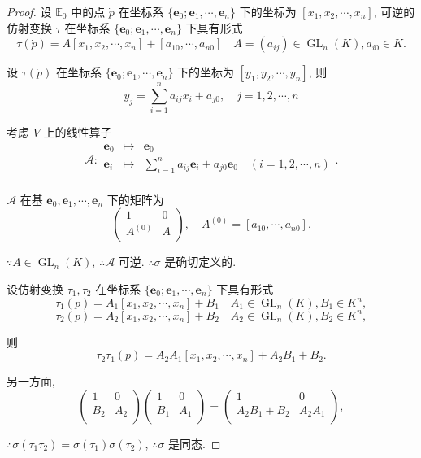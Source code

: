 \documentclass{ctexart}
\begin{document}
\begin{proof}
    设 $\mathbb{E}_0$ 中的点 $\dot{p}$ 在坐标系 $\{\boldsymbol{e}_0;\boldsymbol{e}_1,\cdots,\boldsymbol{e}_n\}$ 下的坐标为 $[x_1,x_2,\cdots,x_n]$, 可逆的仿射变换 $\tau$ 在坐标系 $\{\boldsymbol{e}_0;\boldsymbol{e}_1,\cdots,\boldsymbol{e}_n\}$ 下具有形式
    \[\tau(\dot{p})=A[x_1,x_2,\cdots,x_n]+[a_{10},\cdots,a_{n0}]\quad A=(a_{ij})\in\operatorname{GL}_n(K),a_{i0}\in K.\]

    设 $\tau(\dot{p})$ 在坐标系 $\{\boldsymbol{e}_0;\boldsymbol{e}_1,\cdots,\boldsymbol{e}_n\}$ 下的坐标为 $[y_1,y_2,\cdots,y_n]$, 则
    \[y_j=\sum\limits_{i=1}^na_{ij}x_i+a_{j0},\quad j=1,2,\cdots,n\]

    考虑 $V$ 上的线性算子
    \[\mathcal{A}:\begin{array}{rcl}
        \boldsymbol{e}_0 & \mapsto & \boldsymbol{e}_0 \\
        \boldsymbol{e}_i & \mapsto & \sum\limits_{i=1}^na_{ij}\boldsymbol{e}_i+a_{j0}\boldsymbol{e}_0\quad(i=1,2,\cdots,n) \\
    \end{array}.\]

    $\mathcal{A}$ 在基 $\boldsymbol{e}_0,\boldsymbol{e}_1,\cdots,\boldsymbol{e}_n$ 下的矩阵为
    \[\begin{pmatrix}
        1 & 0 \\
        A^{(0)} & A \\
    \end{pmatrix},\quad A^{(0)}=[a_{10},\cdots,a_{n0}].\]

    $\because A\in\operatorname{GL}_n(K)$, $\therefore\mathcal{A}$ 可逆. $\therefore\sigma$ 是确切定义的.

    设仿射变换 $\tau_1,\tau_2$ 在坐标系 $\{\boldsymbol{e}_0;\boldsymbol{e}_1,\cdots,\boldsymbol{e}_n\}$ 下具有形式
    \[\tau_1(\dot{p})=A_1[x_1,x_2,\cdots,x_n]+B_1\quad A_1\in\operatorname{GL}_n(K),B_1\in K^n,\]
    \[\tau_2(\dot{p})=A_2[x_1,x_2,\cdots,x_n]+B_2\quad A_2\in\operatorname{GL}_n(K),B_2\in K^n,\]

    则
    \[\tau_2\tau_1(\dot{p})=A_2A_1[x_1,x_2,\cdots,x_n]+A_2B_1+B_2.\]

    另一方面,
    \[\begin{pmatrix}
        1 & 0 \\
        B_2 & A_2 \\
    \end{pmatrix}\begin{pmatrix}
        1 & 0 \\
        B_1 & A_1 \\
    \end{pmatrix}=\begin{pmatrix}
        1 & 0 \\
        A_2B_1+B_2 & A_2A_1 \\
    \end{pmatrix},\]

    $\therefore\sigma(\tau_1\tau_2)=\sigma(\tau_1)\sigma(\tau_2)$, $\therefore\sigma$ 是同态.
\end{proof}
\end{document}
